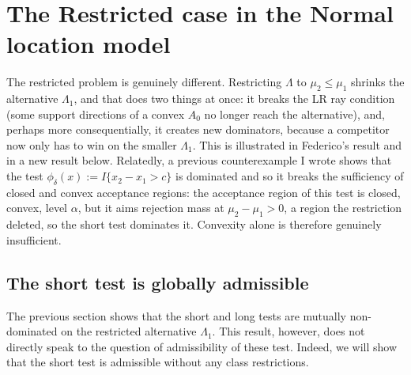 \documentclass[12pt]{article}
\theoremstyle{definition}
\theoremstyle{remark}
\begin{document}
\section*{The Restricted case in the Normal location model}
The restricted problem is genuinely different. Restricting $\Lambda$ to $\mu_2\le \mu_1$ shrinks the alternative $\Lambda_1$, and that does two things at once: it breaks the LR ray condition (some support directions of a convex $A_0$ no longer reach the alternative), and, perhaps more consequentially, it creates new dominators, because a competitor now only has to win on the smaller $\Lambda_1$. This is illustrated in Federico's result and in a new result below. Relatedly, a previous counterexample I wrote shows that the test $\phi_{\delta}(x):=I\{x_2-x_1 > c\}$ is dominated and so it breaks the sufficiency of closed and convex acceptance regions: the acceptance region of this test is closed, convex, level $\alpha$, but it aims rejection mass at $\mu_2-\mu_1 > 0$, a region the restriction deleted, so the short test dominates it. Convexity alone is therefore genuinely insufficient.

\noindent
{}
\subsection*{The short test is globally admissible}
The previous section shows that the short and long tests are mutually non-dominated on the restricted alternative $\Lambda_1$. This result, however, does not directly speak to the question of admissibility of these test. Indeed, we will show that the short test is admissible without any class restrictions.
\end{document}
